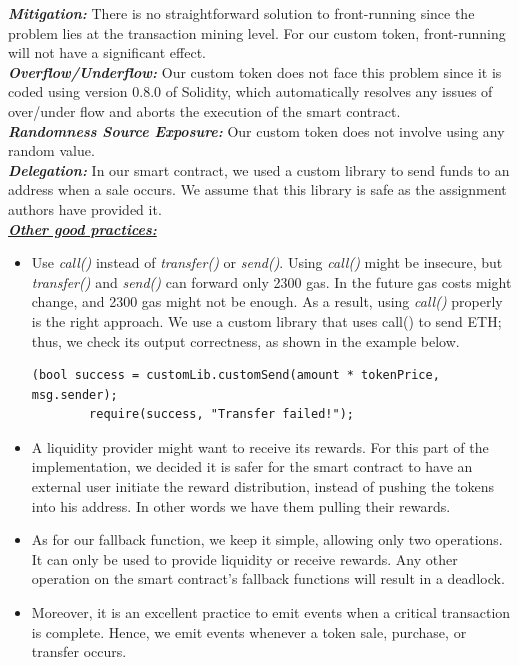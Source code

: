 \documentclass[12pt,a4paper]{article}
\begin{document}
\textbf{\emph{Mitigation: }}There is no straightforward solution to
front-running since the problem lies at the transaction mining level. For our
custom token, front-running will not have a significant effect. \\

\textbf{\emph{Overflow/Underflow: }} Our custom token does not face this problem
since it is coded using version 0.8.0 of Solidity, which automatically resolves
any issues of over/under flow and aborts the execution of the smart contract.\\

\textbf{\emph{Randomness Source Exposure: }} Our custom token does not involve
using any random value. \\

\textbf{\emph{Delegation: }}In our smart contract, we used a custom library to
send funds to an address when a sale occurs. We assume that this library is safe
as the assignment authors have provided it. \\

\textbf{\emph{\underline{Other good practices:}}}

\begin{itemize}
    \item Use \emph{call()} instead of \emph{transfer()} or \emph{send()}. Using
    \emph{call()}  might be insecure, but \emph{transfer()} and \emph{send()}
    can forward only 2300 gas. In the future gas costs might change, and 2300
    gas might not be enough. As a result, using \emph{call()} properly is the
    right approach. We use a custom library that uses call() to send ETH; thus,
    we check its output correctness, as shown in the example below.\\
    \begin{lstlisting}[language=Solidity]
        (bool success = customLib.customSend(amount * tokenPrice, msg.sender);
        require(success, "Transfer failed!");
    \end{lstlisting}
    \item A liquidity provider might want to receive its rewards. For this part
    of the implementation, we decided it is safer for the smart contract to have
    an external user initiate the reward distribution, instead of pushing the
    tokens into his address. In other words we have them pulling their rewards.
    \item As for our fallback function, we keep it simple, allowing only two
    operations. It can only be used to provide liquidity or receive rewards. Any
    other operation on the smart contract's fallback functions will result in a
    deadlock.
    \item Moreover, it is an excellent practice to emit events when a critical
    transaction is complete. Hence, we emit events whenever a token sale,
    purchase, or transfer occurs.
\end{itemize}
\end{document}
